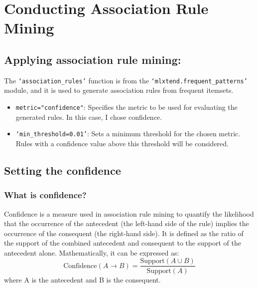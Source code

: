 

\section{Conducting Association Rule Mining}

\subsection{Applying association rule mining:}
The \verb|‘association_rules’| function is from the \verb|‘mlxtend.frequent_patterns’| module, and it is used to generate association rules from frequent itemsets. 
\begin{itemize}
    \item \verb|metric="confidence"|: Specifies the metric to be used for evaluating the generated rules. In this case, I chose confidence. 
    \item \verb|‘min_threshold=0.01’|: Sets a minimum threshold for the chosen metric. Rules with a confidence value above this threshold will be considered.
\end{itemize}

\subsection{Setting the confidence}
\subsubsection{What is confidence?}
Confidence is a measure used in association rule mining to quantify the likelihood that the occurrence of the antecedent (the left-hand side of the rule) implies the occurrence of the consequent (the right-hand side). It is defined as the ratio of the support of the combined antecedent and consequent to the support of the antecedent alone. Mathematically, it can be expressed as:
\begin{equation}
\text{Confidence}(A \rightarrow B) = \frac{\text{Support}(A \cup B)}{\text{Support}(A)}
\end{equation}
where A is the antecedent and B is the consequent.

